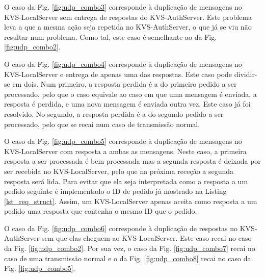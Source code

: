 O caso da Fig. \ref{fig:udp_combo3} corresponde à duplicação de mensagens no KVS-LocalServer sem entrega de respostas do KVS-AuthServer. Este problema leva a que a mesma ação seja repetida no KVS-AuthServer, o que já se viu não resultar num problema. Como tal, este caso é semelhante ao da Fig. \ref{fig:udp_combo2}.

O caso da Fig. \ref{fig:udp_combo4} corresponde à duplicação de mensagens no KVS-LocalServer e entrega de apenas uma das respostas. Este caso pode dividir-se em dois. Num primeiro, a resposta perdida é a do primeiro pedido a ser processado, pelo que o caso equivale ao caso em que uma mensagem é enviada, a resposta é perdida, e uma nova mensagem é enviada outra vez. Este caso já foi resolvido. No segundo, a resposta perdida é a do segundo pedido a ser processado, pelo que se recai num caso de transmissão normal.

O caso da Fig. \ref{fig:udp_combo5} corresponde à duplicação de mensagens no KVS-LocalServer com resposta a ambas as mensagens. Neste caso, a primeira resposta a ser processada é bem processada mas a segunda resposta é deixada por ser recebida no KVS-LocalServer, pelo que na próxima receção a segunda resposta será lida. Para evitar que ela seja interpretada como a resposta a um pedido seguinte é implementado o ID de pedido já mostrado na Listing \ref{lst_req_struct}. Assim, um KVS-LocalServer apenas aceita como resposta a um pedido uma resposta que contenha o mesmo ID que o pedido.

O caso da Fig. \ref{fig:udp_combo6} corresponde à duplicação de respostas no KVS-AuthServer sem que elas cheguem ao KVS-LocalServer. Este caso recai no caso da Fig. \ref{fig:udp_combo2}. Por sua vez, o caso da Fig. \ref{fig:udp_combo7} recai no caso de uma transmissão normal e o da Fig. \ref{fig:udp_combo8} recai no caso da Fig. \ref{fig:udp_combo5}.

